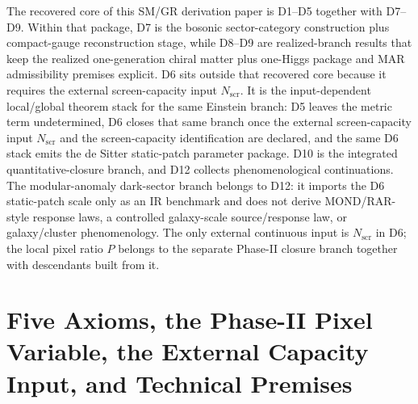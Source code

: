 \documentclass[11pt]{article}
\begin{document}
The recovered core of this SM/GR derivation paper is D1--D5 together with D7--D9. Within that package, D7 is the bosonic sector-category construction plus compact-gauge reconstruction stage, while D8--D9 are realized-branch results that keep the realized one-generation chiral matter plus one-Higgs package and MAR admissibility premises explicit. D6 sits outside that recovered core because it requires the external screen-capacity input \(N_{\mathrm{scr}}\). It is the input-dependent local/global theorem stack for the same Einstein branch: D5 leaves the metric term undetermined, D6 closes that same branch once the external screen-capacity input \(N_{\mathrm{scr}}\) and the screen-capacity identification are declared, and the same D6 stack emits the de Sitter static-patch parameter package. D10 is the integrated quantitative-closure branch, and D12 collects phenomenological continuations. The modular-anomaly dark-sector branch belongs to D12: it imports the D6 static-patch scale only as an IR benchmark and does not derive MOND/RAR-style response laws, a controlled galaxy-scale source/response law, or galaxy/cluster phenomenology. The only external continuous input is \(N_{\mathrm{scr}}\) in D6; the local pixel ratio \(P\) belongs to the separate Phase-II closure branch together with descendants built from it.
\section{Five Axioms, the Phase-II Pixel Variable, the External Capacity Input, and Technical Premises}\label{sec:premise-ledger}
\end{document}
